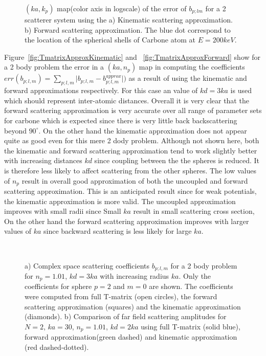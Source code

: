 \begin{figure}[h!]
  \centering
\caption{$(ka,k_p)$ map(color axis in logscale) of the error of $b_{p;lm}$
for a 2 scatterer system using the
a) Kinematic scattering approximation.
b) Forward scattering approximation.
The blue dot correspond to the location of the spherical shells of Carbone
atom at $E=200keV$.}
\end{figure}

Figure~\ref{fig:TmatrixApproxKinematic} and ~\ref{fig:TmatrixApproxForward} show
for a 2 body problem the error in a $(ka,n_p)$ map in computing the coefficients
$err(b_{p;l,m})=\sum_{p;l,m} \lvert b_{p;l,m} - b_{p;l,m}^{approx} \rvert)$
as a result of using the kinematic and forward approximations respectively.
For this case an value of $kd=3ka$ is used which should represent inter-atomic distances.
Overall it is very clear that the forward scattering approximation is very accurate
over all range of parameter sets for carbone which is expected since there is very
little back backscattering beyond $90^{\circ}$. On the other hand the kinematic
approximation does not appear quite as good even for this mere 2 dody problem.
Although not shown here, both the kinematic and forward scattering approximation
tend to work slightly better with increasing distances $kd$ since coupling between the
the spheres is reduced.
 It is therefore less likely to affect scattering from the other spheres.
The low values of $n_p$ result in overall good approximation of both the uncoupled and forward scattering approximation. This is an anticipated result since for weak potentials, the kinematic approximation is more valid.
The uncoupled approximation improves with small radii since Small $ka$ result in small scattering cross section,
On the other hand the forward scattering approximation improves with larger values of $ka$ since backward scattering is less likely for large $ka$.


\begin{figure}[h!]
  \centering
  \\
  \vspace{-1.1em}
\caption{
a) Complex space scattering coefficients $b_{p;l,m}$ for a 2 body problem for
$n_p=1.01$, $kd=3ka$ with increasing radius $ka$.
Only the coefficients for sphere $p=2$ and $m=0$ are shown.
The coefficients were computed from full T-matrix (open circles), the forward
scattering approximation (squares) and the kinematic approximation (diamonds).
b) Comparison of far field scattering amplitudes for $N=2$, $ka=30$, $n_p=1.01$,
$kd=2ka$ using full T-matrix (solid blue), forward approximation(green dashed)
and kinematic approximation (red dashed-dotted).}
\end{figure}

